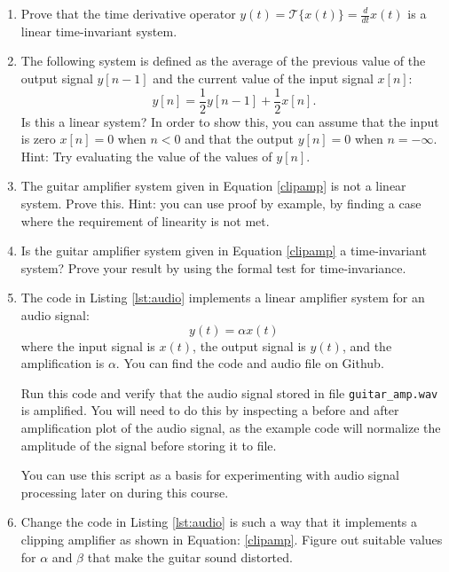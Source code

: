 \begin{enumerate}
\item Prove that the time derivative operator $y(t) = \mathcal{T}\{x(t)\} = \frac{d}{dt} x(t)$
is a linear time-invariant system.

\item The following system is defined as the average of the previous
value of the output signal $y[n-1]$ and the current value of the
input signal $x[n]$:
$$y[n]=\frac{1}{2}y[n-1]+\frac{1}{2}x[n].$$
Is this a linear system? In order to show this, you can assume that the input is zero $x[n]=0$ when $n<0$ and that the output $y[n]=0$ when $n=-\infty$. Hint: Try evaluating the value of the values of $y[n]$.

\item The guitar amplifier system given in Equation \ref{clipamp} is not a linear system. Prove this. Hint: you can use proof by example, by finding a case where the requirement of linearity is not met.

\item Is the guitar amplifier system given in Equation \ref{clipamp} a time-invariant system? Prove your result by using the formal test for time-invariance.

\item The code in Listing \ref{lst:audio} implements a linear amplifier system for an audio signal:
\begin{equation}
y(t) = \alpha x(t)
\end{equation}
where the input signal is $x(t)$, the output signal is $y(t)$, and the
amplification is $\alpha$. You can find the code and audio file on
Github.

Run this code and verify that the audio signal stored in
file \verb|guitar_amp.wav| is amplified. You will need to do this by inspecting a before and after amplification plot of the audio signal, as the example code will normalize the amplitude of the signal before storing it to file.

You can use this script as a basis for experimenting with audio signal
processing later on during this course.

\item Change the code in Listing \ref{lst:audio} is such a way that it implements a clipping amplifier as shown in Equation: \ref{clipamp}. Figure out suitable values for $\alpha$ and $\beta$ that make the guitar sound distorted.

\end{enumerate}
